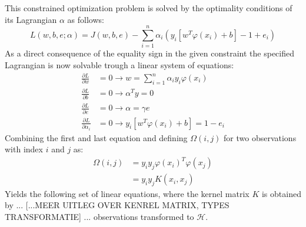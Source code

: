 \documentclass[preprint,12pt]{elsarticle}
\begin{document}
This constrained optimization problem is solved by the optimality conditions of its Lagrangian $\alpha$ as follows:
\begin{equation}
L(w,b,e;\alpha) = J(w,b,e) - \sum_{i=1}^{n} \alpha_i(y_i [ w^T \varphi(x_i) + b]-1 + e_i)
\label{eq:lagrangian}
\end{equation}
As a direct consequence of the equality sign in the given constraint the specified Lagrangian is now solvable trough a linear system of equations:
\begin{align}
\frac{\partial L}{\partial w} &= 0 \rightarrow w = \sum_{i=1}^{n} \alpha_i y_i \varphi(x_i) \\
\frac{\partial L}{\partial b} &= 0 \rightarrow \alpha^T y = 0 \\
\frac{\partial L}{\partial e} &= 0 \rightarrow \alpha = \gamma e \\
\frac{\partial L}{\partial \alpha_i} &= 0 \rightarrow y_i [w^T \varphi(x_i) + b ] = 1 - e_i 	
\end{align}
Combining the first and last equation and defining $\Omega{(i,j)}$ for two observations with index $i$ and $j$ as:
\begin{align}
\Omega{(i,j)} &= y_i y_j \varphi(x_i)^T \varphi(x_j) \\
&= y_i y_j K(x_i, x_j)
\end{align}
Yields the following set of linear equations, where the kernel matrix $K$ is obtained by ... [...MEER UITLEG OVER KENREL MATRIX, TYPES TRANSFORMATIE] ... observations transformed to $\mathcal{H}$.
\end{document}
